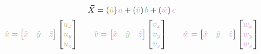 \documentclass[preview]{standalone}
\begin{document}
$$\vec{X} = \left(\textcolor[HTML]{d2b057}{\hat{u}}\right)\textcolor[HTML]{d2b057}{a} + \left(\textcolor[HTML]{43c8dc}{\hat{v}}\right)\textcolor[HTML]{43c8dc}{b} + \left(\textcolor[HTML]{dd99d8}{\hat{w}}\right)\textcolor[HTML]{dd99d8}{c}$$
$$\begin{align*}
\textcolor[HTML]{d2b057}{\hat{u}} = \begin{bmatrix}\textcolor[HTML]{f59789}{\hat{x}}&\textcolor[HTML]{7dc98c}{\hat{y}}&\textcolor[HTML]{96b1fe}{\hat{z}}\end{bmatrix}\begin{bmatrix}\textcolor[HTML]{d2b057}{u}_{\textcolor[HTML]{f59789}{x}}\\\textcolor[HTML]{d2b057}{u}_{\textcolor[HTML]{7dc98c}{y}}\\\textcolor[HTML]{d2b057}{u}_{\textcolor[HTML]{96b1fe}{z}}\end{bmatrix}
&\quad&
\textcolor[HTML]{43c8dc}{\hat{v}} = \begin{bmatrix}\textcolor[HTML]{f59789}{\hat{x}}&\textcolor[HTML]{7dc98c}{\hat{y}}&\textcolor[HTML]{96b1fe}{\hat{z}}\end{bmatrix}\begin{bmatrix}\textcolor[HTML]{43c8dc}{v}_{\textcolor[HTML]{f59789}{x}}\\\textcolor[HTML]{43c8dc}{v}_{\textcolor[HTML]{7dc98c}{y}}\\\textcolor[HTML]{43c8dc}{v}_{\textcolor[HTML]{96b1fe}{z}}\end{bmatrix}
&\quad&
\textcolor[HTML]{dd99d8}{\hat{w}} = \begin{bmatrix}\textcolor[HTML]{f59789}{\hat{x}}&\textcolor[HTML]{7dc98c}{\hat{y}}&\textcolor[HTML]{96b1fe}{\hat{z}}\end{bmatrix}\begin{bmatrix}\textcolor[HTML]{dd99d8}{w}_{\textcolor[HTML]{f59789}{x}}\\\textcolor[HTML]{dd99d8}{w}_{\textcolor[HTML]{7dc98c}{y}}\\\textcolor[HTML]{dd99d8}{w}_{\textcolor[HTML]{96b1fe}{z}}\end{bmatrix}
\end{align*}$$
\end{document}
